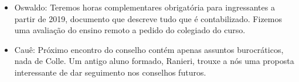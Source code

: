 \documentclass{ata-calico}
\begin{document}
\maketitle


\begin{itemize}
\item Oswaldo: Teremos horas complementares obrigatória para ingressantes a partir de 2019, documento que descreve tudo que é contabilizado. Fizemos uma avaliação do ensino remoto a pedido do colegiado do curso.

\item Cauê: Próximo encontro do conselho contém apenas assuntos burocráticos, nada de Colle. Um antigo aluno formado, Ranieri, trouxe a nós uma proposta interessante de dar seguimento nos conselhos futuros.
\end{itemize}

\end{document}
